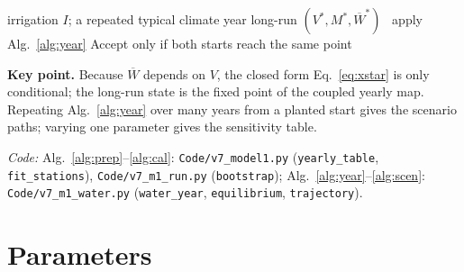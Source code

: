 \documentclass[11pt,a4paper]{article}
\newcommand{\Wb}{\overline W}
\begin{document}
\begin{algorithm}[H]
\caption{Long-run state for a given irrigation level}\label{alg:scen}
\begin{algorithmic}[1]
\Require irrigation $I$; a repeated typical climate year
\Ensure long-run $(V^*,M^*,\Wb^*)$
  \Repeat\ apply Alg.~\ref{alg:year}
\EndFor
\State Accept only if both starts reach the same point
\end{algorithmic}
\end{algorithm}
\noindent\textbf{Key point.} Because $\Wb$ depends on $V$, the closed form Eq.~\eqref{eq:xstar} is only conditional;
the long-run state is the fixed point of the coupled yearly map. Repeating Alg.~\ref{alg:year} over many years
from a planted start gives the scenario paths; varying one parameter gives the sensitivity table.

\noindent\textit{Code:} Alg.~\ref{alg:prep}--\ref{alg:cal}: \texttt{Code/v7\_model1.py} (\texttt{yearly\_table},
\texttt{fit\_stations}), \texttt{Code/v7\_m1\_run.py} (\texttt{bootstrap});
Alg.~\ref{alg:year}--\ref{alg:scen}: \texttt{Code/v7\_m1\_water.py} (\texttt{water\_year}, \texttt{equilibrium}, \texttt{trajectory}).

\section{Parameters}\label{sec:par}
\end{document}
